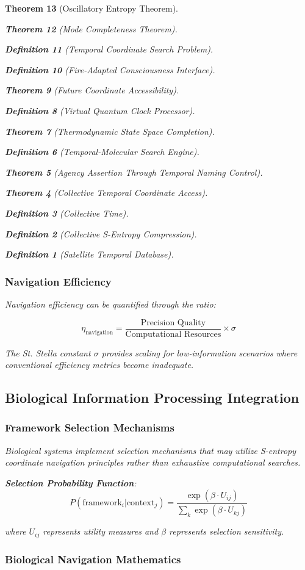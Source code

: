 \documentclass[12pt,a4paper]{article}
\newtheorem{theorem}{Theorem}[section]
\newtheorem{definition}[theorem]{Definition}
\begin{document}
\begin{theorem}[Oscillatory Entropy Theorem]
\begin{theorem}[Mode Completeness Theorem]
\begin{enumerate}
\begin{definition}[Temporal Coordinate Search Problem]
\begin{algorithm}
\begin{definition}[Fire-Adapted Consciousness Interface]
\begin{theorem}[Future Coordinate Accessibility]
\begin{definition}[Virtual Quantum Clock Processor]
\begin{itemize}
\begin{itemize}
\begin{theorem}[Thermodynamic State Space Completion]
\begin{definition}[Temporal-Molecular Search Engine]
\begin{theorem}[Agency Assertion Through Temporal Naming Control]
\begin{remark}
\begin{theorem}[Collective Temporal Coordinate Access]
\begin{definition}[Collective Time]
\begin{definition}[Collective S-Entropy Compression]
\begin{definition}[Satellite Temporal Database]
\begin{algorithm}
\begin{table}[h]
{{\subsubsection{Navigation Efficiency}

Navigation efficiency can be quantified through the ratio:

\begin{equation}
\eta_{\text{navigation}} = \frac{\text{Precision Quality}}{\text{Computational Resources}} \times \sigma
\label{eq:navigation_efficiency}
\end{equation}

The St. Stella constant $\sigma$ provides scaling for low-information scenarios where conventional efficiency metrics become inadequate.

\subsection{Biological Information Processing Integration}

\subsubsection{Framework Selection Mechanisms}

Biological systems implement selection mechanisms that may utilize S-entropy coordinate navigation principles rather than exhaustive computational searches.

\textbf{Selection Probability Function}:
\begin{equation}
P(\text{framework}_i | \text{context}_j) = \frac{\exp(\beta \cdot U_{ij})}{\sum_k \exp(\beta \cdot U_{kj})}
\label{eq:framework_selection}
\end{equation}

where $U_{ij}$ represents utility measures and $\beta$ represents selection sensitivity.

\subsubsection{Biological Navigation Mathematics}

}}
\end{table}
\end{algorithm}
\end{definition}
\end{definition}
\end{definition}
\end{theorem}
\end{remark}
\end{theorem}
\end{definition}
\end{theorem}
\end{itemize}
\end{itemize}
\end{definition}
\end{theorem}
\end{definition}
\end{algorithm}
\end{definition}
\end{enumerate}
\end{theorem}
\end{theorem}
\end{document}
